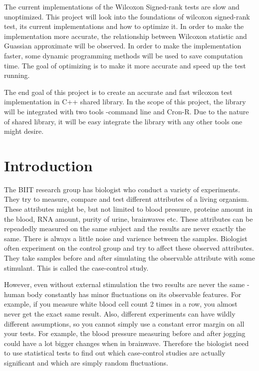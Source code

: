 \documentclass[12pt]{article}
\begin{document}
The current implementations of the Wilcoxon Signed-rank tests are slow and unoptimized. This project will look into the foundations of wilcoxon signed-rank test, its current implementations and how to optimize it. In order to make the implementation more accurate, the relationship between Wilcoxon statistic and Guassian approximate will be observed. In order to make the implementation faster, some dynamic programming methods will be used to save computation time. The goal of optimizing is to make it more accurate and speed up the test running.

The end goal of this project is to create an accurate and fast wilcoxon test implementation in C++ shared library. In the scope of this project, the library will be integrated with two tools -command line and Cron-R. Due to the nature of shared library, it will be easy integrate the library with any other tools one might desire.

\vspace*{3ex}
{}



\newpage

\tableofcontents

\newpage

\section{Introduction}
The BIIT research group has biologist who conduct a variety of experiments. They try to measure, compare and test different attributes of a living organism. These attributes might be, but not limited to blood pressure, proteine amount in the blood, RNA amount, purity of urine, brainwaves etc. These attributes can be repeadedly measured on the same subject and the results are never exactly the same. There is always a little noise and varience between the samples. Biologist often experiment on the control group and try to affect these observed attributes. They take samples before and after simulating the observable attribute with some stimulant. This is called the case-control study.

However, even without external stimulation the two results are never the same - human body constantly has minor fluctuations on its observable features. For example, if you measure white blood cell count 2 times in a row, you almost never get the exact same result. Also, different experiments can have wildly different assumptions, so you cannot simply use a constant error margin on all your tests. For example, the blood pressure measuring before and after jogging could have a lot bigger changes when in brainwave.  Therefore the biologist need to use statistical tests to find out which case-control studies are actually significant and which are simply random fluctuations.
\end{document}
